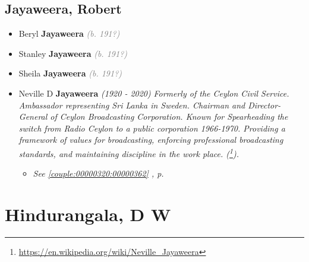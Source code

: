 \documentclass[10pt, openany]{book}
\begin{document}
\chapter{Jayaweera, Robert}
\label{00002549}
\textcolor{slmaroon}{\textit{}}
\begin{itemize}
\item{Beryl \textbf{Jayaweera} \textcolor{gray}{\textit{(b. 191?)}}
 }
\item{Stanley \textbf{Jayaweera} \textcolor{gray}{\textit{(b. 191?)}}
 }
\item{Sheila \textbf{Jayaweera} \textcolor{gray}{\textit{(b. 191?)}}
 }
\item{Neville D \textbf{Jayaweera} \textcolor{slorange}{\textit{(1920 - 2020)}} \textcolor{slmaroon}{\textit{Formerly of the Ceylon Civil Service. Ambassador representing Sri Lanka in Sweden. Chairman and Director-General of Ceylon Broadcasting Corporation. Known for Spearheading the switch from Radio Ceylon to a public corporation 1966-1970. Providing a framework of values for broadcasting, enforcing professional broadcasting standards, and maintaining discipline in the work place. (\footnote{\url{https://en.wikipedia.org/wiki/Neville_Jayaweera}}).}}
\begin{itemize}
\item{\textcolor{slteal}{\textit{See  \autoref{couple:00000320:00000362} \textit{, p. \pageref{couple:00000320:00000362} }}}}
\end{itemize}
  }
\end{itemize}
 
\part{Hindurangala, D W}
\end{document}
